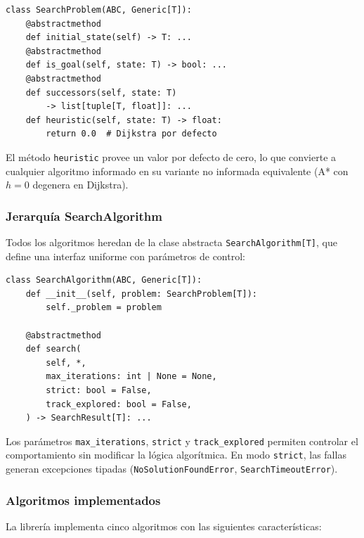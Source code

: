 \begin{lstlisting}[caption={Interfaz abstracta SearchProblem[T]}, label={lst:searchproblem}]
class SearchProblem(ABC, Generic[T]):
    @abstractmethod
    def initial_state(self) -> T: ...
    @abstractmethod
    def is_goal(self, state: T) -> bool: ...
    @abstractmethod
    def successors(self, state: T)
        -> list[tuple[T, float]]: ...
    def heuristic(self, state: T) -> float:
        return 0.0  # Dijkstra por defecto
\end{lstlisting}

El método \texttt{heuristic} provee un valor por defecto de cero, lo que convierte a cualquier algoritmo informado en su variante no informada equivalente (A* con $h=0$ degenera en Dijkstra).

\subsubsection{Jerarquía SearchAlgorithm}

Todos los algoritmos heredan de la clase abstracta \texttt{SearchAlgorithm[T]}, que define una interfaz uniforme con parámetros de control:

\begin{lstlisting}[caption={Base abstracta para algoritmos de búsqueda}, label={lst:searchalg}]
class SearchAlgorithm(ABC, Generic[T]):
    def __init__(self, problem: SearchProblem[T]):
        self._problem = problem

    @abstractmethod
    def search(
        self, *,
        max_iterations: int | None = None,
        strict: bool = False,
        track_explored: bool = False,
    ) -> SearchResult[T]: ...
\end{lstlisting}

Los parámetros \texttt{max\_iterations}, \texttt{strict} y \texttt{track\_explored} permiten controlar el comportamiento sin modificar la lógica algorítmica. En modo \texttt{strict}, las fallas generan excepciones tipadas (\texttt{NoSolutionFoundError}, \texttt{SearchTimeoutError}).

\subsubsection{Algoritmos implementados}

La librería implementa cinco algoritmos con las siguientes características:

